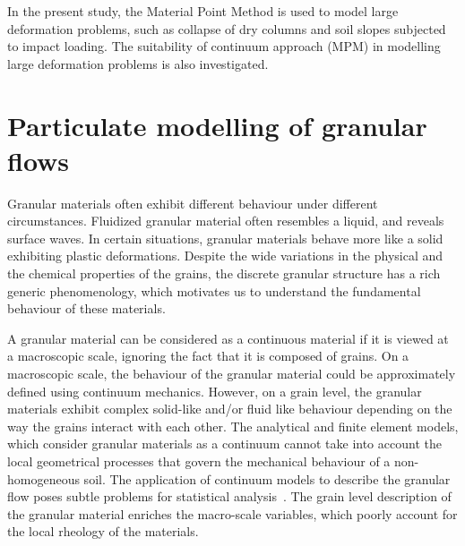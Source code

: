 In the present study, the Material Point Method is used to model large 
deformation problems, such as collapse of dry columns and soil slopes subjected 
to impact loading. The suitability of continuum approach (MPM) in modelling 
large deformation problems is also investigated.

\section{Particulate modelling of granular flows}

Granular materials often exhibit different behaviour under different 
circumstances. Fluidized granular material often resembles a liquid, and 
reveals surface waves. In certain situations, granular materials behave more 
like a solid exhibiting plastic deformations. Despite the wide variations in 
the physical and the chemical properties of the grains, the discrete granular 
structure has a rich generic phenomenology, which motivates us to understand 
the fundamental behaviour of these materials. 

A granular material can be 
considered as a continuous material if it is viewed at a macroscopic scale, 
ignoring the fact that it is composed of grains. On a macroscopic scale, the 
behaviour of the granular material could be approximately defined using 
continuum mechanics. However, on a grain level, the granular materials 
exhibit complex solid-like and/or fluid like behaviour depending on the way the 
grains interact with each other. The analytical and finite element models, 
which consider granular materials as a continuum cannot take into account the 
local geometrical processes that govern the mechanical behaviour of a 
non-homogeneous soil. The application of continuum models to describe the 
granular flow poses subtle problems for statistical analysis~\citep{Mehta1994}. 
The grain level description of the granular material enriches the macro-scale 
variables, which poorly account for the local rheology of the materials. 


